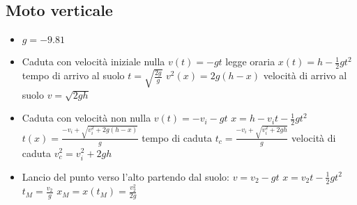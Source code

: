 	\subsection{Moto verticale}
	\begin{itemize}
		\item $g=-9.81$
		\item Caduta con velocit\`a iniziale nulla $v(t) = -gt$ legge oraria $x(t) = h - \frac{1}{2}gt^2$ tempo di arrivo al suolo $t = \sqrt{\frac{2g}{g}}$ $v^2(x) = 2g(h-x)$ velocit\`a di arrivo al suolo $v=\sqrt{2gh}$
		\item Caduta con velocit\`a non nulla $v(t) =-v_i -gt$ $x=h-v_it-\frac{1}{2}gt^2$ $t(x) = \frac{-v_i + \sqrt{v_i^2+2g(h-x)}}{g}$ tempo di caduta $t_c = \frac{-v_i + \sqrt{v_i^2+2gh}}{g}$ velocit\`a di caduta $v_c^2 = v_i^2 + 2gh$
		\item Lancio del punto verso l'alto partendo dal suolo: $v = v_2 - gt$ $x = v_2t - \frac{1}{2}gt^2$ $t_M = \frac{v_2}{g}$ $x_M = x(t_M) = \frac{v_2^2}{2g}$
	\end{itemize}
